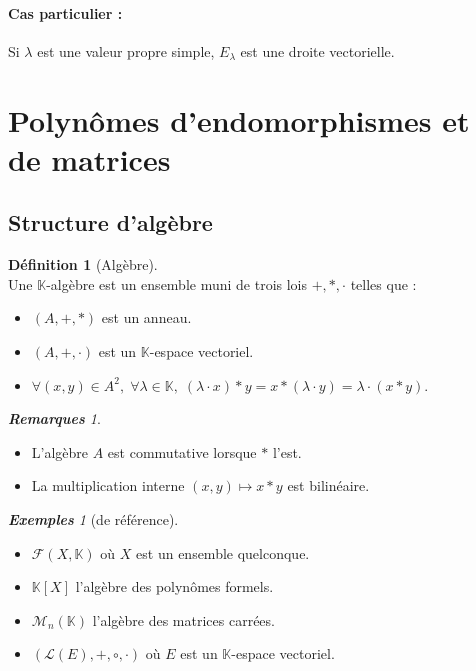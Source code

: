 \documentclass[12pt]{book}
\let\ensembleNombre\mathbb
\newcommand*\K{\ensuremath{\ensembleNombre{K}}}
\theoremstyle{definition}
\newtheorem*{defi}{Définition}
\theoremstyle{remark}
\newtheorem*{rems}{\textbf{Remarques}}
\newtheorem*{exs}{\textbf{Exemples}}
\newenvironment{fdef}
  {\begin{mdframed}[roundcorner=10pt, linewidth=1pt]\begin{defi}}
  {\end{defi}\end{mdframed}}
\begin{document}
	\paragraph{Cas particulier : } Si $\lambda$ est une valeur propre simple, $E_\lambda$ est une droite vectorielle.
	
	\section{Polynômes d'endomorphismes et de matrices}
	\subsection{Structure d'algèbre}
	\begin{fdef}[Algèbre] \mbox{~}\\
	Une $\K$-algèbre est un ensemble muni de trois lois $+, *, \cdot$ telles que :
	\begin{itemize}
	\item[1)] $(A, +, *)$ est un anneau.
	\item[2)] $(A, +, \cdot)$ est un $\K$-espace vectoriel.
	\item[3)] $\forall (x,y) \in A^2,\; \forall \lambda \in \K,\; (\lambda \cdot x) * y = x * (\lambda \cdot y) = \lambda \cdot (x * y)$.
	\end{itemize}
	\end{fdef}
	
	\begin{rems}\mbox{~}\\
	\begin{itemize}
	\item L'algèbre $A$ est commutative lorsque $*$ l'est.
	\item La multiplication interne $(x,y) \mapsto x * y$ est bilinéaire.
	\end{itemize}
	\end{rems} \pagebreak
	
	\begin{exs}[de référence]\mbox{~}\\
	\begin{itemize}
	\item $\mathcal F(X, \K)$ où $X$ est un ensemble quelconque.
	\item $\K[X]$ l'algèbre des polynômes formels.
	\item $\mathcal M_n(\K)$ l'algèbre des matrices carrées.
	\item $(\mathcal L(E), +, \circ, \cdot)$ où $E$ est un $\K$-espace vectoriel.
	\end{itemize}
	\end{exs}
	
\end{document}
